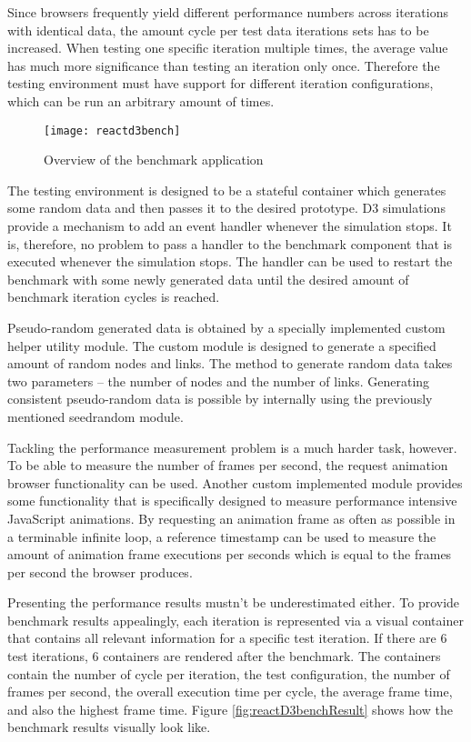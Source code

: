 Since browsers frequently yield different performance numbers across iterations with identical data, the amount cycle per test data iterations sets has to be increased. When testing one specific iteration multiple times, the average value has much more significance than testing an iteration only once. Therefore the testing environment must have support for different iteration configurations, which can be run an arbitrary amount of times.

\begin{figure}
  \centering
  \texttt{[image: reactd3bench]}
  \caption{Overview of the benchmark application}
  \label{fig:reactD3bench1}
\end{figure}

The testing environment is designed to be a stateful container which generates some random data and then passes it to the desired prototype. D3 simulations provide a mechanism to add an event handler whenever the simulation stops. It is, therefore, no problem to pass a handler to the benchmark component that is executed whenever the simulation stops. The handler can be used to restart the benchmark with some newly generated data until the desired amount of benchmark iteration cycles is reached.

Pseudo-random generated data is obtained by a specially implemented custom helper utility module. The custom module is designed to generate a specified amount of random nodes and links. The method to generate random data takes two parameters -- the number of nodes and the number of links. Generating consistent pseudo-random data is possible by internally using the previously mentioned seedrandom module.

Tackling the performance measurement problem is a much harder task, however. To be able to measure the number of frames per second, the request animation browser functionality can be used. Another custom implemented module provides some functionality that is specifically designed to measure performance intensive JavaScript animations. By requesting an animation frame as often as possible in a terminable infinite loop, a reference timestamp can be used to measure the amount of animation frame executions per seconds which is equal to the frames per second the browser produces.

Presenting the performance results mustn't be underestimated either. To provide benchmark results appealingly, each iteration is represented via a visual container that contains all relevant information for a specific test iteration. If there are 6 test iterations, 6 containers are rendered after the benchmark. The containers contain the number of cycle per iteration, the test configuration, the number of frames per second, the overall execution time per cycle, the average frame time, and also the highest frame time. Figure \ref{fig:reactD3benchResult} shows how the benchmark results visually look like.

